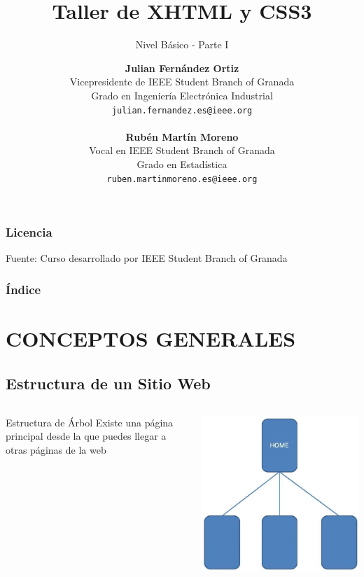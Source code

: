 \documentclass{beamer}
\title[XHTML y CSS]{Taller de XHTML y CSS3}
\subtitle{Nivel Básico - Parte I}
\author[Julián Fernández, Rubén Martín]{
	\textbf{Julian Fernández Ortiz }
	\\
	\medskip
	\scriptsize{
	Vicepresidente de IEEE Student Branch of Granada\\
	Grado en Ingeniería Electrónica Industrial
	}	
	\\	
	\texttt{julian.fernandez.es@ieee.org}
	\\ \ \\
	\small{\textbf{Rubén Martín Moreno}}
	\\
	\medskip
	\scriptsize{
	Vocal en IEEE Student Branch of Granada\\
	Grado en Estadística
	}
	\\
	\texttt{ruben.martinmoreno.es@ieee.org}
}
\date{}
\begin{document}
\frame{\titlepage}

\begin{frame}
\frametitle{Licencia}
\doclicenseThis
Fuente: Curso desarrollado por IEEE Student Branch of Granada
\end{frame}

\begin{frame}
  \frametitle{Índice}
  \tableofcontents
\end{frame}

\section{CONCEPTOS GENERALES}
	\subsection{Estructura de un Sitio Web}
\begin{frame}
  \begin{columns}[c]
	\begin{block}{Estructura de Árbol}
	Existe una página principal desde la que puedes llegar a otras páginas de la web
	\end{block}

	\begin{center}
	\includegraphics[scale=.3]{images/EstructuraArbol.JPG} 
	\end{center}
  \end{columns}
\end{frame}
\end{document}
